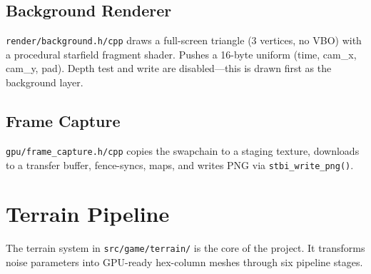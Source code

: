 \documentclass[11pt,a4paper]{article}
\begin{document}
\subsection{Background Renderer}

\texttt{render/background.h/cpp} draws a full-screen triangle (3 vertices, no VBO) with a procedural starfield fragment shader. Pushes a 16-byte uniform (time, cam\_x, cam\_y, pad). Depth test and write are disabled---this is drawn first as the background layer.

\subsection{Frame Capture}

\texttt{gpu/frame\_capture.h/cpp} copies the swapchain to a staging texture, downloads to a transfer buffer, fence-syncs, maps, and writes PNG via \texttt{stbi\_write\_png()}.

\section{Terrain Pipeline}
\label{sec:terrain}

The terrain system in \texttt{src/game/terrain/} is the core of the project. It transforms noise parameters into GPU-ready hex-column meshes through six pipeline stages.
\end{document}

